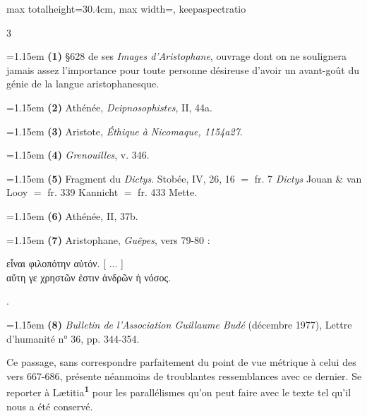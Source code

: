 \documentclass[11pt,twoside]{book}
\newcommand{\italique}[1]{\textit{#1}}
\newcommand{\citComm}[1]{\begin{quoting}[vskip=0.4pt,leftmargin=0.7em,rightmargin=0.2em]#1\end{quoting}}
\newcommand{\marqueur}[1]{\textsuperscript{\color{rubricRed}\textbf{#1}}}
\begin{document}
\begin{adjustbox}{max totalheight=30.4cm, max width=\textwidth, keepaspectratio}
\begin{minipage}{\textwidth}
{\begin{multicols}{3}
\par\vspace{1.5pt}
\par\vspace{1.2pt}\par\nopagebreak\vspace{1pt}\noindent\hangindent=1.15em {\color{sepiaNote}\textbf{(1)}} §628 de ses \italique{Images d'Aristophane}, ouvrage dont on ne soulignera jamais assez l'importance pour toute personne désireuse d'avoir un avant-goût du génie de la langue aristophanesque.
\par\vspace{1.5pt}
\noindent\hangindent=1.15em {\color{sepiaNote}\textbf{(2)}} Athénée, \italique{Deipnosophistes}, II, 44a.
\par\vspace{1.5pt}
\noindent\hangindent=1.15em {\color{sepiaNote}\textbf{(3)}} Aristote, \italique{Éthique à Nicomaque, 1154a27}.
\par\vspace{1.5pt}
\noindent\hangindent=1.15em {\color{sepiaNote}\textbf{(4)}} \italique{Grenouilles}, v. 346.
\par\vspace{1.5pt}
\noindent\hangindent=1.15em {\color{sepiaNote}\textbf{(5)}} Fragment du \italique{Dictys}. Stobée, IV, 26, 16 $=$ fr. 7 \italique{Dictys} Jouan \& van Looy $=$ fr. 339 Kannicht $=$ fr. 433 Mette.
\par\vspace{1.5pt}
\noindent\hangindent=1.15em {\color{sepiaNote}\textbf{(6)}} Athénée, II, 37b.
\par\vspace{1.5pt}
\noindent\hangindent=1.15em {\color{sepiaNote}\textbf{(7)}} Aristophane, \italique{Guêpes}, vers 79-80 :
\citComm{εἶναι φιλοπότην αὐτόν. [ ... ]\\
αὕτη γε χρηστῶν ἐστιν ἀνδρῶν ἡ νόσος.}.
\par\vspace{1.5pt}
\noindent\hangindent=1.15em {\color{sepiaNote}\textbf{(8)}} \italique{Bulletin de l'Association Guillaume Budé} (décembre 1977), Lettre d'humanité n° 36, pp. 344-354.
\par\vspace{1.5pt}
 \textbf{} Ce passage, sans correspondre parfaitement du point de vue métrique à celui des vers 667-686, présente néanmoins de troublantes ressemblances avec ce dernier. Se reporter à Lætitia\marqueur{1} pour les parallélismes qu'on peut faire avec le texte tel qu'il nous a été conservé.

\end{multicols}}
\end{minipage}
\end{adjustbox}
\end{document}
